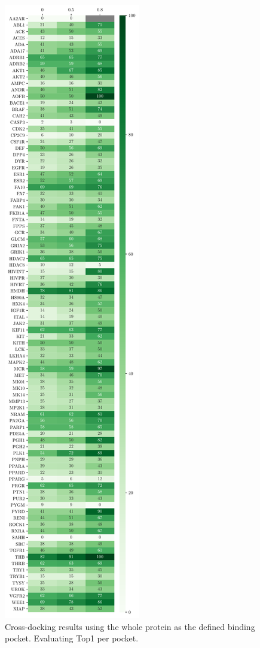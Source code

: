 \documentclass[journal=jcisd8,manuscript=article]{achemso}
\begin{document}
\begin{figure}
    \centering
    \includegraphics[height=0.9\textheight]{figures/crossdocking/thresh_top1_per_pocket.pdf}
    \caption{Cross-docking results using the whole protein as the defined binding pocket. Evaluating Top1 per pocket.}
    \label{fig:Thresh_PerPock}
\end{figure}
\end{document}
